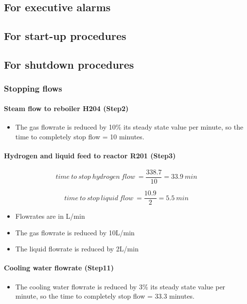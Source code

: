 \subsection{For executive alarms}

\subsection{For start-up procedures}

\subsection{For shutdown procedures}

\subsubsection{Stopping flows}
\paragraph{Steam flow to reboiler H204 (Step2)}   
    \begin{itemize}
        \item The gas flowrate is reduced by 10\% its steady state value per minute, so the time to completely stop flow = 10 minutes.
    \end{itemize}
    
\paragraph{Hydrogen and liquid feed to reactor R201 (Step3)}
    \begin{equation}
        time\:to\:stop\:hydrogen\:flow\:=\frac{338.7}{10}=33.9\:min
    \end{equation}
    
    \begin{equation}
        time\:to\:stop\:liquid\:flow\:=\frac{10.9}{2}=5.5\:min
    \end{equation}
    
    \begin{itemize}
        \item Flowrates are in L/min
        \item The gas flowrate is reduced by 10L/min
        \item The liquid flowrate is reduced by 2L/min
    \end{itemize}
    
\paragraph{Cooling water flowrate (Step11)}
    \begin{itemize}
        \item The cooling water flowrate is reduced by 3\% its steady state value per minute, so the time to completely stop flow = 33.3 minutes.
    \end{itemize}
    
